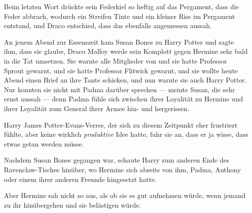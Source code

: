 Beim letzten Wort drückte sein Federkiel so heftig auf das Pergament, dass die Feder abbrach, wodurch ein Streifen Tinte und ein kleiner Riss im Pergament entstand, und Draco entschied, dass das ebenfalls angemessen aussah.

\later

An jenem Abend zur Essenszeit kam Susan Bones zu Harry Potter und sagte ihm, dass sie glaube, Draco Malfoy werde sein Komplott gegen Hermine sehr bald in die Tat umsetzen. Sie warnte alle Mitglieder von \SPHEW und sie hatte Professor Sprout gewarnt, und sie hatte Professor Flitwick gewarnt, und sie wollte heute Abend einen Brief an ihre Tante schicken, und nun warnte sie auch Harry Potter. Nur konnten sie nicht mit Padma darüber sprechen — meinte Susan, die sehr ernst aussah — denn Padma fühle sich zwischen ihrer Loyalität zu Hermine und ihrer Loyalität zum General ihrer Armee hin- und hergerissen.

Harry James Potter-Evans-Verres, der sich zu diesem Zeitpunkt eher frustriert fühlte, aber keine wirklich \emph{produktive} Idee hatte, fuhr sie an, dass er ja wisse, dass etwas getan werden müsse.

Nachdem Susan Bones gegangen war, schaute Harry zum anderen Ende des Ravenclaw-Tisches hinüber, wo Hermine sich abseits von ihm, Padma, Anthony oder einem ihrer anderen Freunde hingesetzt hatte.

Aber Hermine sah nicht so aus, als ob sie es gut aufnehmen würde, wenn jemand zu ihr hinübergehen und sie belästigen würde.

